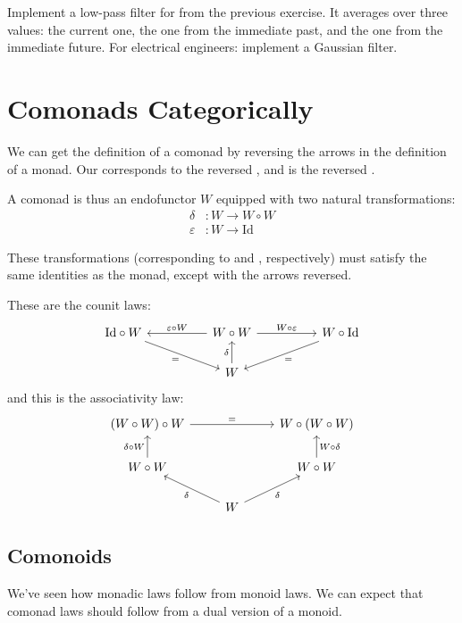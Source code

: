 \documentclass[DaoFP]{subfiles}
\begin{document}
\begin{exercise}
Implement a low-pass filter for  from the previous exercise. It averages over three values: the current one, the one from the immediate past, and the one from the immediate future. For electrical engineers: implement a Gaussian filter. 
\end{exercise}

\section{Comonads Categorically}

We can get the definition of a comonad by reversing the arrows in the definition of a monad. Our  corresponds to the reversed , and  is the reversed . 


A comonad is thus an endofunctor $W$ equipped with two natural transformations:
\begin{align*}
\delta &\colon W \to W \circ W \\
\varepsilon &\colon W \to \text{Id} 
\end{align*}

These transformations (corresponding to  and , respectively) must satisfy the same identities as the monad, except with the arrows reversed. 

These are the counit laws:
\[
 \begin{tikzcd}
\text{Id} \circ W
 \arrow[rrd, "="']
& & W \circ W
 \arrow[ll, "\varepsilon \circ W"']
 \arrow[rr, "W \circ \varepsilon"]
&& W \circ \text{Id}
 \arrow[lld, "="]
 \\
 && W
  \arrow[u, "\delta"]
 \end{tikzcd}
\]
and this is the associativity law:
\[
 \begin{tikzcd}
 (W \circ W) \circ W 
 \arrow[rr, "="]
 &&
 W \circ (W \circ W)
 \\
 W \circ W 
 \arrow[u, "\delta \circ W"]
& & W \circ W
 \arrow[u, "W \circ \delta"']
 \\
&  W
 \arrow[ul, "\delta"]
 \arrow[ur, "\delta"']
 \end{tikzcd}
\]

\subsection{Comonoids}

We've seen how monadic laws follow from monoid laws. We can expect that comonad laws should follow from a dual version of a monoid. 
\end{document}
